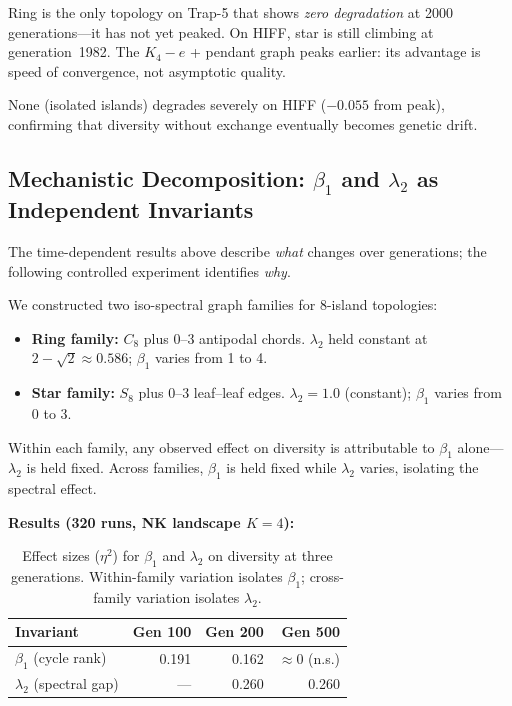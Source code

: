 \documentclass[sigconf,nonacm]{acmart}
\begin{document}
Ring is the only topology on Trap-5 that shows \emph{zero degradation}
at 2000 generations---it has not yet peaked. On HIFF, star is still
climbing at generation~1982. The $K_4{-}e$ + pendant graph peaks
earlier: its advantage is speed of convergence, not asymptotic quality.

None (isolated islands) degrades severely on HIFF ($-0.055$ from peak),
confirming that diversity without exchange eventually becomes genetic
drift.

\subsection{Mechanistic Decomposition: $\beta_1$ and $\lambda_2$ as Independent Invariants}
\label{sec:bridge}

The time-dependent results above describe \emph{what} changes over generations;
the following controlled experiment identifies \emph{why}.

We constructed two iso-spectral graph families for 8-island topologies:

\begin{itemize}
\item \textbf{Ring family:} $C_8$ plus 0--3 antipodal chords.
  $\lambda_2$ held constant at $2 - \sqrt{2} \approx 0.586$;
  $\beta_1$ varies from 1 to 4.
\item \textbf{Star family:} $S_8$ plus 0--3 leaf--leaf edges.
  $\lambda_2 = 1.0$ (constant); $\beta_1$ varies from 0 to 3.
\end{itemize}

Within each family, any observed effect on diversity is attributable to
$\beta_1$ alone---$\lambda_2$ is held fixed. Across families, $\beta_1$
is held fixed while $\lambda_2$ varies, isolating the spectral effect.

\textbf{Results (320 runs, NK landscape $K = 4$):}

\begin{table}[h]
\caption{Effect sizes ($\eta^2$) for $\beta_1$ and $\lambda_2$ on diversity at three
  generations. Within-family variation isolates $\beta_1$; cross-family
  variation isolates $\lambda_2$.}
\label{tab:bridge}
\centering
\begin{tabular}{lrrr}
\toprule
\textbf{Invariant} & \textbf{Gen 100} & \textbf{Gen 200} & \textbf{Gen 500} \\
\midrule
$\beta_1$ (cycle rank) & 0.191 & 0.162 & $\approx 0$ (n.s.) \\
$\lambda_2$ (spectral gap) & --- & 0.260 & 0.260 \\
\bottomrule
\end{tabular}
\end{table}
\end{document}

